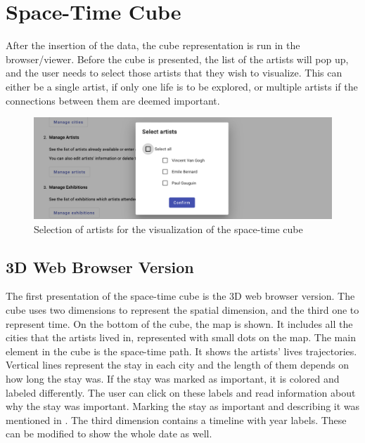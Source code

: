 \section{Space-Time Cube}\label{sec:impl-stc}
After the insertion of the data, the cube representation is run in the browser/viewer. Before the cube is presented, the list of the artists will
pop up, and the user needs to select those artists that they wish to visualize. This can either be a single artist, if only one life is to be
explored, or multiple artists if the connections between them are deemed important.

\begin{figure}[hbt!]
    \begin{center}
        \includegraphics[width=\textwidth]{graphics/3-implementation/9}
    \end{center}
    \caption{Selection of artists for the visualization of the space-time cube}
    \label{fig:figure3.9}
\end{figure}

\subsection{3D Web Browser Version}\label{subsec:3d-version}
The first presentation of the space-time cube is the 3D web browser version. The cube uses two dimensions to
represent the spatial dimension, and the third one to represent time. On the bottom of the cube, the map is shown. It includes all the cities
that the artists lived in, represented with small dots on the map. The main element in the cube is the space-time path. It shows the artists'
lives trajectories. Vertical lines represent the stay in each city and the length of them depends on how long the stay
was. If the stay was marked as important, it is colored and labeled differently. The user can click
on these labels and read information about why the stay was important. Marking the stay as important and describing it was mentioned in
. The third dimension contains a timeline with year labels. These can be modified to show the whole date as well.

